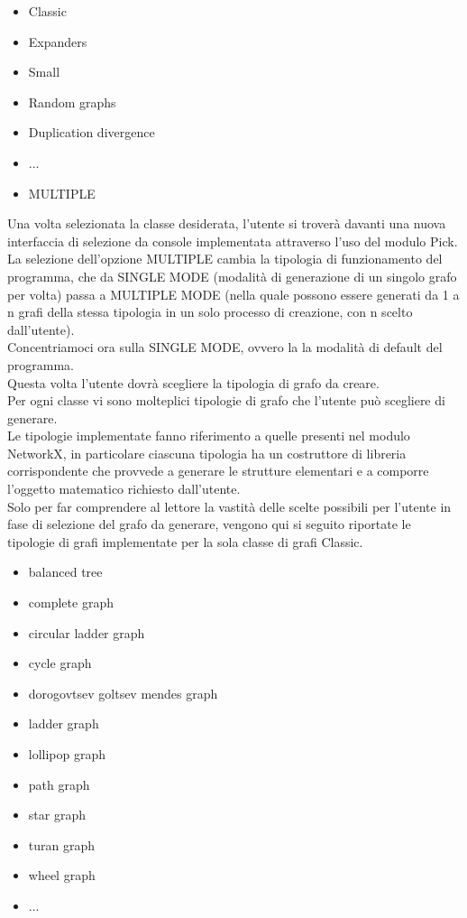 \begin{itemize}
	\item Classic
	\item Expanders
	\item Small 
	\item Random graphs 
	\item Duplication divergence 
	\item ...
	\item MULTIPLE
\end{itemize}

Una volta selezionata la classe desiderata, l'utente si troverà davanti una nuova interfaccia di selezione da console implementata attraverso l'uso del modulo Pick.\\

La selezione dell'opzione MULTIPLE cambia la tipologia di funzionamento del programma, che da SINGLE MODE (modalità di generazione di un singolo grafo per volta) passa a MULTIPLE MODE (nella quale possono essere generati da 1 a n grafi della stessa tipologia in un solo processo di creazione, con n scelto dall'utente).\\
Concentriamoci ora sulla SINGLE MODE, ovvero la la modalità di default del programma.\\

Questa volta l'utente dovrà scegliere la tipologia di grafo da creare.\\
Per ogni classe vi sono molteplici tipologie di grafo che l'utente può scegliere di generare.\\

Le tipologie implementate fanno riferimento a quelle presenti nel modulo NetworkX, in particolare ciascuna tipologia ha un costruttore di libreria corrispondente che provvede a generare le strutture elementari e a comporre l'oggetto matematico richiesto dall'utente.\\

Solo per far comprendere al lettore la vastità delle scelte possibili per l'utente in fase di selezione del grafo da generare, vengono qui si seguito riportate le tipologie di grafi implementate per la sola classe di grafi Classic.

\begin{itemize}
	\item balanced tree
	\item complete graph
	\item circular ladder graph
	\item cycle graph
	\item dorogovtsev goltsev mendes graph
	\item ladder graph
	\item lollipop graph
	\item path graph
	\item star graph
	\item turan graph
	\item wheel graph
	\item ...
\end{itemize}

